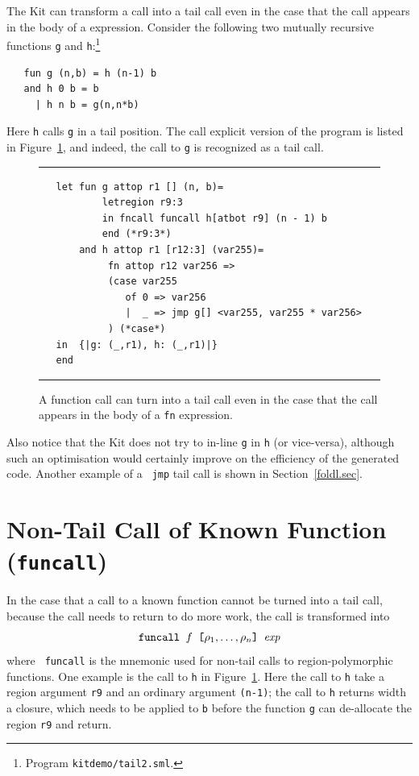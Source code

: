 \documentclass[12pt]{book}
\begin{document}
The Kit can transform a call into a  tail call even in the
case that the call appears in the body of a  expression.
Consider the following two mutually recursive functions {\tt g} and
{\tt h}:\footnote{Program {\tt kitdemo/tail2.sml}.}
\begin{verbatim}
   fun g (n,b) = h (n-1) b
   and h 0 b = b
     | h n b = g(n,n*b)
\end{verbatim}
Here {\tt h} calls {\tt g} in a tail position. The call explicit
version of the program is listed in Figure~\ref{tail2.fig}, and
indeed, the call to {\tt g} is recognized as a tail call.
\begin{figure}
\hrule \medskip
\begin{verbatim}
   let fun g attop r1 [] (n, b)= 
           letregion r9:3 
           in fncall funcall h[atbot r9] (n - 1) b 
           end (*r9:3*)
       and h attop r1 [r12:3] (var255)= 
            fn attop r12 var256 => 
            (case var255 
               of 0 => var256
               |  _ => jmp g[] <var255, var255 * var256>
            ) (*case*) 
   in  {|g: (_,r1), h: (_,r1)|}
   end 
\end{verbatim}
\caption{A function call can turn into a tail call even 
  in the case that the call appears in the body of a {\tt fn} expression.}  
\medskip \hrule
\label{tail2.fig}
\end{figure}
Also notice that the Kit does not try to in-line {\tt g} in {\tt h}
(or vice-versa), although such an optimisation would certainly improve
on the efficiency of the generated code. Another example of a {\tt
  jmp} tail call is shown in Section~\ref{foldl.sec}.

\section{Non-Tail Call of Known Function ({\tt funcall})}
In the case that a call to a known function cannot be turned into a
tail call, because the call needs to return to do more work, the call
is transformed into
$$\hbox{\tt funcall $f$ [$\rho_1, \ldots, \rho_n$] $\hbox{\it exp}$}$$
where {\tt
  funcall} is the mnemonic used for non-tail calls to
region-polymorphic functions. One example is the call to {\tt h} in
Figure~\ref{tail2.fig}. Here the call to {\tt h} take a region
argument {\tt r9} and an ordinary argument {\tt (n-1)}; the call to
{\tt h} returns width a closure, which needs to be applied to {\tt b}
before the function {\tt g} can de-allocate the region {\tt r9} and
return.
\end{document}
